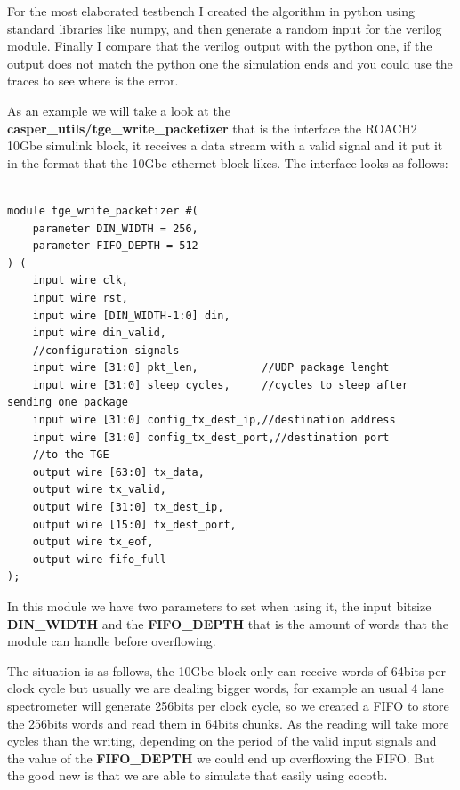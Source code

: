 For the most elaborated testbench I created the algorithm in python using standard libraries like numpy, and then generate a random input for the verilog module. Finally I compare that the verilog output with the python one, if the output does not match the python one the simulation ends and you could use the traces to see where is the error. 

As an example we will take a look at the \textbf{casper\_utils/tge\_write\_packetizer} that is the interface the ROACH2 10Gbe simulink block, it receives a data stream with a valid signal and it put it in the format that the 10Gbe ethernet block likes.
The interface looks as follows:

\newpage
\begin{lstlisting}[language=VBScript]

module tge_write_packetizer #(
    parameter DIN_WIDTH = 256,
    parameter FIFO_DEPTH = 512
) (
    input wire clk,
    input wire rst,
    input wire [DIN_WIDTH-1:0] din,
    input wire din_valid,
    //configuration signals
    input wire [31:0] pkt_len,          //UDP package lenght
    input wire [31:0] sleep_cycles,     //cycles to sleep after sending one package
    input wire [31:0] config_tx_dest_ip,//destination address    
    input wire [31:0] config_tx_dest_port,//destination port
    //to the TGE 
    output wire [63:0] tx_data,
    output wire tx_valid,
    output wire [31:0] tx_dest_ip,
    output wire [15:0] tx_dest_port,
    output wire tx_eof,
    output wire fifo_full
);

\end{lstlisting}

In this module we have two parameters to set when using it, the input bitsize \textbf{DIN\_WIDTH} and the \textbf{FIFO\_DEPTH} that is the amount of words that the module can handle before overflowing.

The situation is as follows, the 10Gbe block only can receive words of 64bits per clock cycle but usually we are dealing bigger words, for example an usual 4 lane spectrometer will generate 256bits per clock cycle, so we created a FIFO to store the 256bits words and read them in 64bits chunks. As the reading will take more cycles than the writing, depending on the period of the valid input signals and the value of the \textbf{FIFO\_DEPTH} we could end up overflowing the FIFO. But the good new is that we are able to simulate that easily using cocotb.


